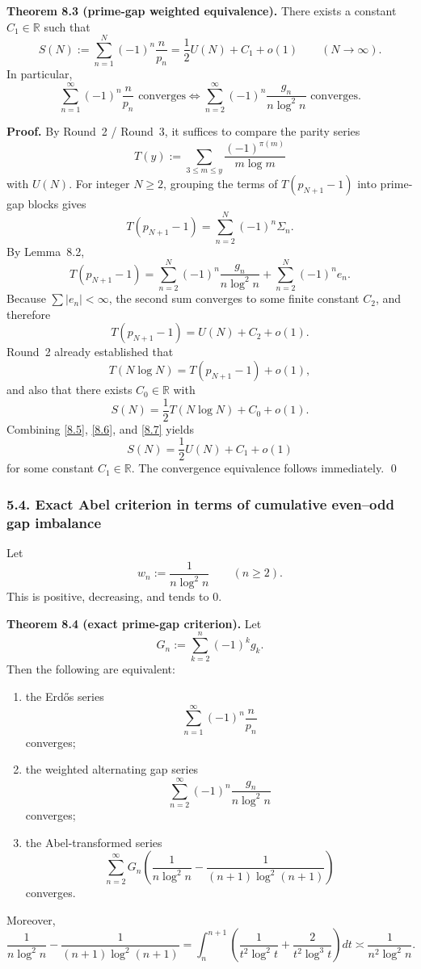 \textbf{Theorem 8.3 (prime-gap weighted equivalence).}
There exists a constant $C_1\in\mathbb R$ such that
\[
S(N):=\sum_{n=1}^N (-1)^n\frac{n}{p_n}
=
\frac12 U(N)+C_1+o(1)
\qquad (N\to\infty).
\]
In particular,
\[
\sum_{n=1}^\infty (-1)^n\frac{n}{p_n}
\text{ converges}
\iff
\sum_{n=2}^\infty (-1)^n\frac{g_n}{n\log^2 n}
\text{ converges}.
\]

\textbf{Proof.}
By Round~2 / Round~3, it suffices to compare the parity series
\[
T(y):=\sum_{3\le m\le y}\frac{(-1)^{\pi(m)}}{m\log m}
\]
with $U(N)$.
For integer $N\ge 2$, grouping the terms of $T(p_{N+1}-1)$ into prime-gap blocks gives
\[
T(p_{N+1}-1)=\sum_{n=2}^N (-1)^n \Sigma_n.
\tag{8.4}
\]
By Lemma~8.2,
\[
T(p_{N+1}-1)
=
\sum_{n=2}^N (-1)^n \frac{g_n}{n\log^2 n}
+
\sum_{n=2}^N (-1)^n e_n.
\]
Because $\sum |e_n|<\infty$, the second sum converges to some finite constant $C_2$, and therefore
\[
T(p_{N+1}-1)=U(N)+C_2+o(1).
\tag{8.5}
\]
Round~2 already established that
\[
T(N\log N)=T(p_{N+1}-1)+o(1),
\tag{8.6}
\]
and also that there exists $C_0\in\mathbb R$ with
\[
S(N)=\frac12 T(N\log N)+C_0+o(1).
\tag{8.7}
\]
Combining \eqref{8.5}, \eqref{8.6}, and \eqref{8.7} yields
\[
S(N)=\frac12 U(N)+C_1+o(1)
\]
for some constant $C_1\in\mathbb R$.
The convergence equivalence follows immediately. \qed

\subsubsection*{5.4. Exact Abel criterion in terms of cumulative even--odd gap imbalance}

Let
\[
w_n:=\frac{1}{n\log^2 n}
\qquad (n\ge 2).
\]
This is positive, decreasing, and tends to $0$.

\textbf{Theorem 8.4 (exact prime-gap criterion).}
Let
\[
G_n:=\sum_{k=2}^n (-1)^k g_k.
\]
Then the following are equivalent:
\begin{enumerate}
\item[(i)] the Erd\H{o}s series
\[
\sum_{n=1}^\infty (-1)^n\frac{n}{p_n}
\]
converges;

\item[(ii)] the weighted alternating gap series
\[
\sum_{n=2}^\infty (-1)^n\frac{g_n}{n\log^2 n}
\]
converges;

\item[(iii)] the Abel-transformed series
\[
\sum_{n=2}^\infty G_n\left(\frac{1}{n\log^2 n}-\frac{1}{(n+1)\log^2(n+1)}\right)
\]
converges.
\end{enumerate}

Moreover,
\[
\frac{1}{n\log^2 n}-\frac{1}{(n+1)\log^2(n+1)}
=
\int_n^{n+1}\left(\frac{1}{t^2\log^2 t}+\frac{2}{t^2\log^3 t}\right)dt
\asymp \frac{1}{n^2\log^2 n}.
\]

